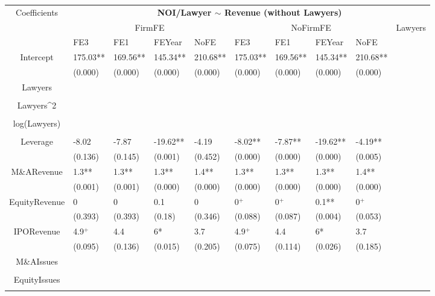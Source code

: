 \documentclass{article}
\begin{document}
\begin{table}[H]
\centering
\begin{tabular}{|clllllllll|}
\hline
\multirow{3}{*}{Coefficients} & \multicolumn{9}{c|}{\textbf{NOI/Lawyer $\sim$ Revenue (without Lawyers)}} \\
\cline{2-10}
& \multicolumn{4}{c}{FirmFE} & \multicolumn{4}{c}{NoFirmFE} & \multirow{2}{*}{Lawyers} \\
\cline{2-9}
& FE3 & FE1 & FEYear & NoFE & FE3 & FE1 & FEYear & NoFE &  \\
\hline
 
Intercept & 175.03** & 169.56** & 145.34** & 210.68** & 175.03** & 169.56** & 145.34** & 210.68** & \\ 
   & (0.000) & (0.000) & (0.000) & (0.000) & (0.000) & (0.000) & (0.000) & (0.000) & \\ 
  Lawyers &  &  &  &  &  &  &  &  & \\ 
   &  &  &  &  &  &  &  &  & \\ 
  Lawyers^2 &  &  &  &  &  &  &  &  & \\ 
   &  &  &  &  &  &  &  &  & \\ 
  log(Lawyers) &  &  &  &  &  &  &  &  & \\ 
   &  &  &  &  &  &  &  &  & \\ 
  Leverage & -8.02 & -7.87 & -19.62** & -4.19 & -8.02** & -7.87** & -19.62** & -4.19** & \\ 
   & (0.136) & (0.145) & (0.001) & (0.452) & (0.000) & (0.000) & (0.000) & (0.005) & \\ 
  M\&ARevenue & 1.3** & 1.3** & 1.3** & 1.4** & 1.3** & 1.3** & 1.3** & 1.4** & \\ 
   & (0.001) & (0.001) & (0.000) & (0.000) & (0.000) & (0.000) & (0.000) & (0.000) & \\ 
  EquityRevenue & 0 & 0 & 0.1 & 0 & 0$^{+}$ & 0$^{+}$ & 0.1** & 0$^{+}$ & \\ 
   & (0.393) & (0.393) & (0.18) & (0.346) & (0.088) & (0.087) & (0.004) & (0.053) & \\ 
  IPORevenue & 4.9$^{+}$ & 4.4 & 6* & 3.7 & 4.9$^{+}$ & 4.4 & 6* & 3.7 & \\ 
   & (0.095) & (0.136) & (0.015) & (0.205) & (0.075) & (0.114) & (0.026) & (0.185) & \\ 
  M\&AIssues &  &  &  &  &  &  &  &  & \\ 
   &  &  &  &  &  &  &  &  & \\ 
  EquityIssues &  &  &  &  &  &  &  &  & \\ 
   &  &  &  &  &  &  &  &  & \\ 

\end{tabular}
\end{table}
\end{document}
